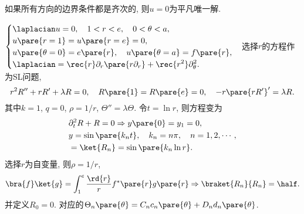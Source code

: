 \documentclass[hidelinks]{ctexart}
\begin{document}
\begin{remark}
    如果所有方向的边界条件都是齐次的, 则$u=0$为平凡唯一解.
\end{remark}
\begin{sample}
    \begin{ex}
        $\displaystyle \begin{cases}
            \laplacian u = 0,\quad 1 < r < e,\quad 0 < \theta < a, \\
            u\pare{r=1} = u\pare{r=e} = 0, \\
            u\pare{\theta=0} = e\pare{r},\quad u\pare{\theta=a} = f\pare{r}, \\
            \displaystyle \laplacian = \rec{r}\partial_r\pare{r\partial_r} + \rec{r^2}\partial_\theta^2.
        \end{cases}$选择$r$的方程作为SL问题,
        \[ r^2R'' + rR' + \lambda R = 0,\quad R\pare{1} = R\pare{e} = 0,\quad -r\pare{rR'}' = \lambda R. \]
        其中$k=1$, $q=0$, $\rho = 1/r$, $\Theta'' = \lambda \Theta$. 令$t=\ln r$, 则方程变为
        \begin{align*}
            & \partial_t^2 R + R = 0 \Rightarrow y\pare{0} = y_1 = 0,\\
            & y = \sin\pare{k_n t},\quad k_n = n\pi,\quad n = 1,2,\cdots,\\
            &= \ket{R_n} = \sin\pare{k_n \ln r}.
        \end{align*}
        选择$r$为自变量, 则$\rho = 1/r$,
        \[ \bra{f}\ket{g} = \int_1^e \frac{\rd{r}}{r} f^*\pare{r}g\pare{r}\Rightarrow \braket{R_n}{R_n} = \half. \]
        并定义$R_0 = 0$. 对应的$\Theta_n\pare{\theta} = C_nc_n\pare{\theta} + D_nd_n\pare{\theta}$. 
    \end{ex}
\end{sample}
\end{document}

